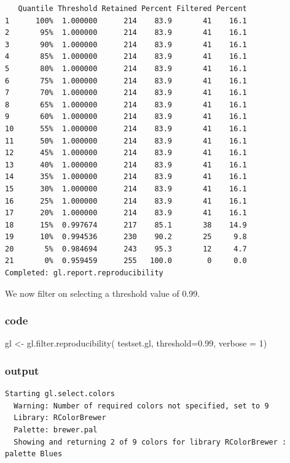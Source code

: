 \documentclass[
  letterpaper,
  DIV=11,
  numbers=noendperiod]{scrreprt}
\newenvironment{Shaded}{\begin{snugshade}}{\end{snugshade}}
\newcommand{\AttributeTok}[1]{\textcolor[rgb]{0.49,0.56,0.16}{#1}}
\newcommand{\DecValTok}[1]{\textcolor[rgb]{0.25,0.63,0.44}{#1}}
\newcommand{\FloatTok}[1]{\textcolor[rgb]{0.25,0.63,0.44}{#1}}
\newcommand{\FunctionTok}[1]{\textcolor[rgb]{0.02,0.16,0.49}{#1}}
\newcommand{\NormalTok}[1]{\textcolor[rgb]{0.00,0.44,0.13}{#1}}
\newcommand{\OtherTok}[1]{\textcolor[rgb]{0.00,0.44,0.13}{#1}}
\begin{document}
\begin{verbatim}
   Quantile Threshold Retained Percent Filtered Percent
1      100%  1.000000      214    83.9       41    16.1
2       95%  1.000000      214    83.9       41    16.1
3       90%  1.000000      214    83.9       41    16.1
4       85%  1.000000      214    83.9       41    16.1
5       80%  1.000000      214    83.9       41    16.1
6       75%  1.000000      214    83.9       41    16.1
7       70%  1.000000      214    83.9       41    16.1
8       65%  1.000000      214    83.9       41    16.1
9       60%  1.000000      214    83.9       41    16.1
10      55%  1.000000      214    83.9       41    16.1
11      50%  1.000000      214    83.9       41    16.1
12      45%  1.000000      214    83.9       41    16.1
13      40%  1.000000      214    83.9       41    16.1
14      35%  1.000000      214    83.9       41    16.1
15      30%  1.000000      214    83.9       41    16.1
16      25%  1.000000      214    83.9       41    16.1
17      20%  1.000000      214    83.9       41    16.1
18      15%  0.997674      217    85.1       38    14.9
19      10%  0.994536      230    90.2       25     9.8
20       5%  0.984694      243    95.3       12     4.7
21       0%  0.959459      255   100.0        0     0.0
Completed: gl.report.reproducibility 
\end{verbatim}

We now filter on selecting a threshold value of 0.99.

\subsubsection{code}

\begin{Shaded}
\begin{Highlighting}[]
\NormalTok{gl }\OtherTok{\textless{}{-}} \FunctionTok{gl.filter.reproducibility}\NormalTok{( testset.gl, }\AttributeTok{threshold=}\FloatTok{0.99}\NormalTok{, }\AttributeTok{verbose =} \DecValTok{1}\NormalTok{)}
\end{Highlighting}
\end{Shaded}

\subsubsection{output}

\begin{verbatim}
Starting gl.select.colors 
  Warning: Number of required colors not specified, set to 9
  Library: RColorBrewer
  Palette: brewer.pal
  Showing and returning 2 of 9 colors for library RColorBrewer : palette Blues 
\end{verbatim}
\end{document}
